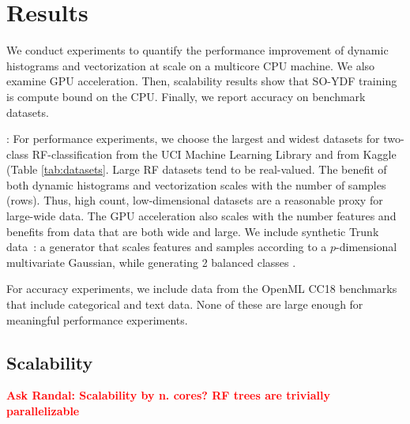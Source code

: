\documentclass[sigconf,anonymous,review]{acmart}
\newcommand{\TODO}[1]{\textbf{\textcolor{red}{#1}}}
\begin{document}
\section{Results}

We conduct experiments to quantify the performance improvement of dynamic histograms and vectorization at scale on a multicore CPU machine. We also examine GPU acceleration. Then, scalability results show that SO-YDF training is compute bound on the CPU. Finally, we report accuracy on benchmark datasets.


: For performance experiments, we choose the largest and widest datasets for two-class RF-classification from the UCI Machine Learning Library and from Kaggle (Table \ref{tab:datasets}. Large RF datasets tend to be real-valued. The benefit of both dynamic histograms and vectorization scales with the number of samples (rows). Thus, high count, low-dimensional datasets are a reasonable proxy for large-wide data. The GPU acceleration also scales with the number features and benefits from data that are both wide and large. We  include synthetic Trunk data~\cite{trunk}: a generator that scales features and samples according to a $p$-dimensional multivariate Gaussian, while generating 2 balanced classes \cite{tomita2020sparse}.

For accuracy experiments, we include data from the OpenML CC18 benchmarks~\cite{bischl2017openml} that include categorical and text data. None of these are large enough for meaningful performance experiments.


\subsection{Scalability}

\TODO{Ask Randal: Scalability by n. cores? RF trees are trivially parallelizable}
\end{document}
